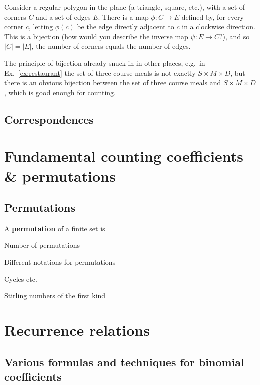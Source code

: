 \documentclass{amsart}
\begin{document}
\begin{nex}
	Consider a regular polygon in the plane (a triangle, square, etc.), with a set of corners $C$ and a set of edges $E$.
	There is a map $\phi \colon C \to E$ defined by, for every corner $c$, letting $\phi(c)$ be the edge directly adjacent to $c$ in a clockwise direction.
	This is a bijection (how would you describe the inverse map $\psi \colon E \to C$?), and so $|C| = |E|$, the number of corners equals the number of edges.
\end{nex}
	
\begin{nremark}
	The principle of bijection already snuck in in other places, e.g.~in Ex.~\ref{ex:restaurant} the set of three course meals is not exactly $S \times M \times D$, but there is an obvious bijection between the set of three course meals and $S \times M \times D$, which is good enough for counting.
\end{nremark}

\subsection{Correspondences}

\newpage
\section{Fundamental counting coefficients \& permutations}

\subsection{Permutations}
\begin{ndefn}
	A \textbf{permutation} of a finite set is
\end{ndefn}

Number of permutations

Different notations for permutations

Cycles etc.

Stirling numbers of the first kind

\newpage
\section{Recurrence relations}
\subsection{Various formulas and techniques for binomial coefficients}
\end{document}
